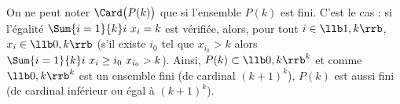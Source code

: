 \documentclass[11pt]{article}%
\begin{document}
\begin{remark}%
  On ne peut noter $\Card\big( P(k) \big)$ que si l'ensemble $P(k)$
  est fini. C'est le cas : si l'égalité $\Sum{i=1}{k} i \ x_i = k$ est
  vérifiée, alors, pour tout $i \in \llb 1, k \rrb$, $x_i \in \llb 0,
  k \rrb$ (s'il existe $i_0$ tel que $x_{i_0} > k$ alors $\Sum{i=1}{k}
  i \ x_i \geq i_0 \ x_{i_0} > k$). Ainsi, $P(k) \subset \llb 0, k
  \rrb^k$ et comme $\llb 0, k \rrb^k$ est un ensemble fini (de
  cardinal $(k + 1)^k$), $P(k)$ est aussi fini (de cardinal inférieur
  ou égal à $(k + 1)^k$).
\end{remark}



\newpage
\end{document}
